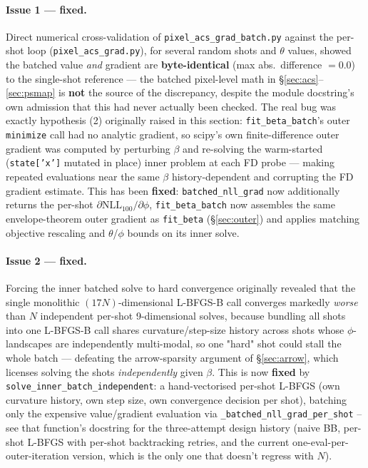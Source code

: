 \documentclass[11pt,a4paper]{article}
\newcommand{\code}[1]{\texttt{#1}}
\begin{document}
\paragraph{Issue 1 --- fixed.} Direct numerical cross-validation of
\code{pixel\_acs\_grad\_batch.py} against the per-shot loop
(\code{pixel\_acs\_grad.py}), for several random shots and $\theta$ values,
showed the batched value \emph{and} gradient are \textbf{byte-identical}
(max abs.\ difference $=0.0$) to the single-shot reference --- the batched
pixel-level math in \S\ref{sec:acs}--\ref{sec:psmap} is \textbf{not} the
source of the discrepancy, despite the module docstring's own admission
that this had never actually been checked. The real bug was exactly
hypothesis (2) originally raised in this section:
\code{fit\_beta\_batch}'s outer \code{minimize} call had no analytic
gradient, so scipy's own finite-difference outer gradient was computed by
perturbing $\beta$ and re-solving the warm-started (\code{state['x']}
mutated in place) inner problem at each FD probe --- making repeated
evaluations near the same $\beta$ history-dependent and corrupting the FD
gradient estimate. This has been \textbf{fixed}: \code{batched\_nll\_grad}
now additionally returns the per-shot $\partial\mathrm{NLL}_{100}/\partial\phi$,
\code{fit\_beta\_batch} now assembles the same envelope-theorem outer
gradient as \code{fit\_beta} (\S\ref{sec:outer}) and applies matching
objective rescaling and $\theta$/$\phi$ bounds on its inner solve.

\paragraph{Issue 2 --- fixed.} Forcing the inner batched solve to hard
convergence originally revealed that the single monolithic
$(17N)$-dimensional L-BFGS-B call converges markedly \emph{worse} than $N$
independent per-shot 9-dimensional solves, because bundling all shots into
one L-BFGS-B call shares curvature/step-size history across shots whose
$\phi$-landscapes are independently multi-modal, so one "hard" shot could
stall the whole batch --- defeating the arrow-sparsity argument of
\S\ref{sec:arrow}, which licenses solving the shots \emph{independently}
given $\beta$. This is now \textbf{fixed} by \code{solve\_inner\_batch\_independent}:
a hand-vectorised per-shot L-BFGS (own curvature history, own step size,
own convergence decision per shot), batching only the expensive
value/gradient evaluation via \code{\_batched\_nll\_grad\_per\_shot} --
see that function's docstring for the three-attempt design history (naive
BB, per-shot L-BFGS with per-shot backtracking retries, and the current
one-eval-per-outer-iteration version, which is the only one that doesn't
regress with $N$).
\end{document}
